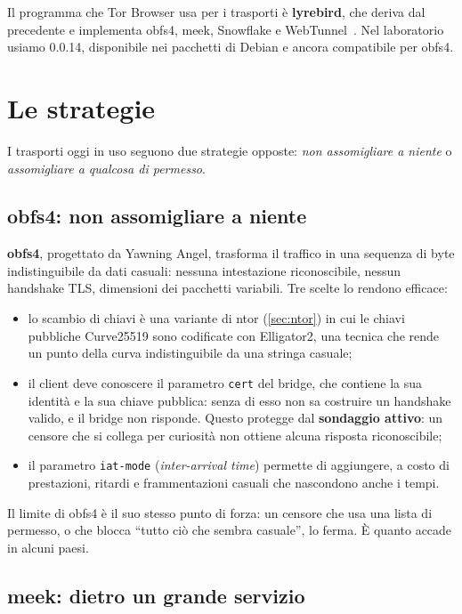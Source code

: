 Il programma che Tor Browser usa per i trasporti è \textbf{lyrebird}, che deriva dal precedente  e implementa obfs4, meek, Snowflake e WebTunnel~\cite{torsupport}. Nel laboratorio usiamo  0.0.14, disponibile nei pacchetti di Debian e ancora compatibile per obfs4.

\section{Le strategie}\label{sec:cens-strategie}

I trasporti oggi in uso seguono due strategie opposte: \emph{non assomigliare a niente} o \emph{assomigliare a qualcosa di permesso}.

\subsection{obfs4: non assomigliare a niente}

\textbf{obfs4}, progettato da Yawning Angel, trasforma il traffico in una sequenza di byte indistinguibile da dati casuali: nessuna intestazione riconoscibile, nessun handshake TLS, dimensioni dei pacchetti variabili. Tre scelte lo rendono efficace:
\begin{itemize}
  \item lo scambio di chiavi è una variante di ntor (\cref{sec:ntor}) in cui le chiavi pubbliche Curve25519 sono codificate con Elligator2, una tecnica che rende un punto della curva indistinguibile da una stringa casuale;
  \item il client deve conoscere il parametro \texttt{cert} del bridge, che contiene la sua identità e la sua chiave pubblica: senza di esso non sa costruire un handshake valido, e il bridge non risponde. Questo protegge dal \textbf{sondaggio attivo}: un censore che si collega per curiosità non ottiene alcuna risposta riconoscibile;
  \item il parametro \texttt{iat-mode} (\emph{inter-arrival time}) permette di aggiungere, a costo di prestazioni, ritardi e frammentazioni casuali che nascondono anche i tempi.
\end{itemize}
Il limite di obfs4 è il suo stesso punto di forza: un censore che usa una lista di permesso, o che blocca \enquote{tutto ciò che sembra casuale}, lo ferma. È quanto accade in alcuni paesi.

\subsection{meek: dietro un grande servizio}


